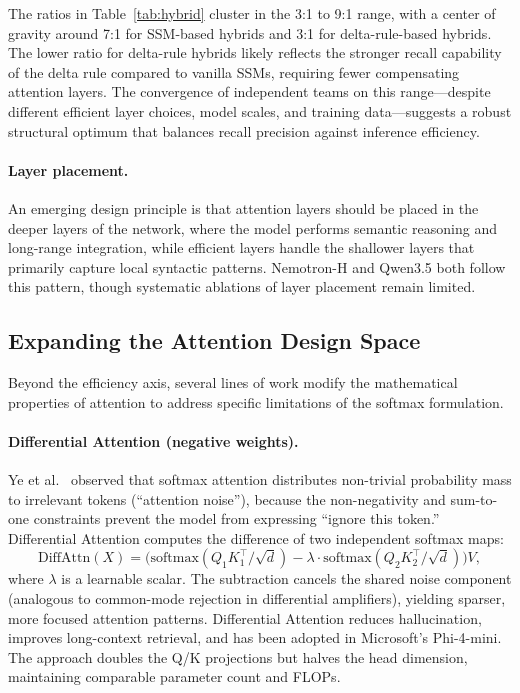 The ratios in Table~\ref{tab:hybrid} cluster in the 3:1 to 9:1 range, with a center of gravity around 7:1 for SSM-based hybrids and 3:1 for delta-rule-based hybrids. The lower ratio for delta-rule hybrids likely reflects the stronger recall capability of the delta rule compared to vanilla SSMs, requiring fewer compensating attention layers. The convergence of independent teams on this range---despite different efficient layer choices, model scales, and training data---suggests a robust structural optimum that balances recall precision against inference efficiency.

\paragraph{Layer placement.}
An emerging design principle is that attention layers should be placed in the deeper layers of the network, where the model performs semantic reasoning and long-range integration, while efficient layers handle the shallower layers that primarily capture local syntactic patterns. Nemotron-H and Qwen3.5 both follow this pattern, though systematic ablations of layer placement remain limited.


\subsection{Expanding the Attention Design Space}
\label{subsec:attn-variants}

Beyond the efficiency axis, several lines of work modify the mathematical properties of attention to address specific limitations of the softmax formulation.

\paragraph{Differential Attention (negative weights).}
Ye et al.~\cite{ye2024differential} observed that softmax attention distributes non-trivial probability mass to irrelevant tokens (``attention noise''), because the non-negativity and sum-to-one constraints prevent the model from expressing ``ignore this token.'' Differential Attention computes the difference of two independent softmax maps:
\begin{equation}
\text{DiffAttn}(X) = \bigl(\text{softmax}(Q_1 K_1^\top / \sqrt{d}) - \lambda \cdot \text{softmax}(Q_2 K_2^\top / \sqrt{d})\bigr) V,
\end{equation}
where $\lambda$ is a learnable scalar. The subtraction cancels the shared noise component (analogous to common-mode rejection in differential amplifiers), yielding sparser, more focused attention patterns. Differential Attention reduces hallucination, improves long-context retrieval, and has been adopted in Microsoft's Phi-4-mini. The approach doubles the Q/K projections but halves the head dimension, maintaining comparable parameter count and FLOPs.

